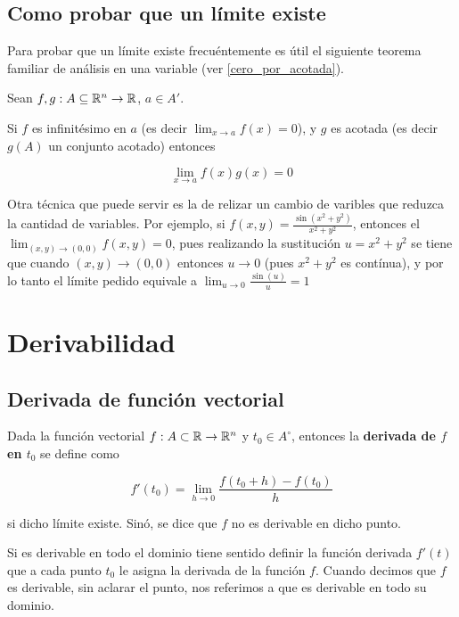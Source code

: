 \section{Como probar que un límite existe}

Para probar que un límite existe frecuéntemente es útil el siguiente teorema familiar de análisis en una variable (ver \ref{cero_por_acotada}).

\begin{theorem}
Sean $f,g:A \subseteq \mathbb{R}^n \to \mathbb{R}$, $a \in A'$.

Si $f$ es infinitésimo en $a$ (es decir $ \lim_{x \to a} f(x) = 0$), y $g$ es acotada (es decir $g(A)$ un conjunto acotado) entonces

$$ \lim_{x \to a} f(x)g(x) = 0 $$
\end{theorem}

Otra técnica que puede servir es la de relizar un cambio de varibles que reduzca la cantidad de variables.  Por ejemplo, si $f(x,y) = \frac{\sin(x^2 + y^2)}{x^2 + y^2}$, entonces el $ \lim_{(x,y) \to (0,0) } f(x,y) = 0$, pues realizando la sustitución $ u = x^2 + y^2$ se tiene que cuando $(x,y) \to (0,0)$ entonces $u \to 0$ (pues $x^2 + y^2$ es contínua), y por lo tanto el límite pedido equivale a $ \lim_{u \to 0} \frac{\sin(u)}{u} = 1$


\chapter{Derivabilidad}

\section{Derivada de función vectorial}

\begin{definition}[Derivada]
Dada la función vectorial $ f: A \subset \mathbb{R} \to \mathbb{R}^n$ y $ t_0 \in A^{\circ}$, entonces la \textbf{derivada de $f$ en $t_0$}  se define como

$$ \displaystyle f'(t_0) = \lim_{h \to 0} \frac{f(t_0 + h) - f(t_0)}{h} $$

si dicho límite existe.  Sinó, se dice que $f$ no es derivable en dicho punto.
\end{definition}

Si es derivable en todo el dominio tiene sentido definir la función derivada $ f'(t)$ que a cada punto $t_0$ le asigna la derivada de la función $f$.  Cuando decimos que $f$ es derivable, sin aclarar el punto, nos referimos a que es derivable en todo su dominio.


